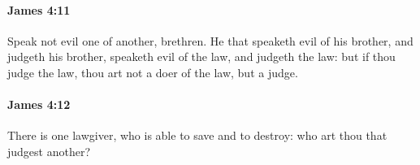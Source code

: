 		\paragraph{James 4:11} %
			\label{JAMES-4-11}

			Speak not evil one of another, brethren. He that speaketh evil of his brother, and judgeth his brother, speaketh evil of the law, and judgeth the law: but if thou judge the law, thou art not a doer of the law, but a judge.

			\begin{framed}
			\scriptsize
				\begin{compactdesc}
					\item[SBLG] 
				\end{compactdesc}
			\end{framed}

		\paragraph{James 4:12} %
			\label{JAMES-4-12}

			There is one lawgiver, who is able to save and to destroy: who art thou that judgest another?

